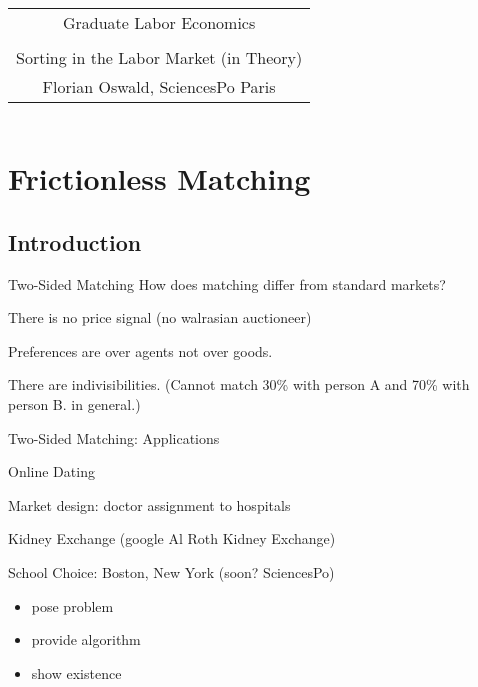 \documentclass{beamer}%
\begin{document}
\title{%
\begin{tabular}{c}
{\small Graduate Labor Economics}\\
\\ 
Sorting in the Labor Market (in Theory)
 \\
{\small Florian Oswald, SciencesPo Paris}
\\
\end{tabular}%
}




\frame{\titlepage} 


\section{Frictionless Matching}

\subsection{Introduction}

\begin{frame}{Two-Sided Matching}
How does matching differ from standard markets?\bigskip
\begin{widee}
\item There is no price signal (no walrasian auctioneer)
\item Preferences are over agents not over goods.
\item There are indivisibilities. (Cannot match 30\% with person A and 70\% with person B. in general.)
\end{widee}
\end{frame}

\begin{frame}{Two-Sided Matching: Applications}
\begin{midi}
\item Online Dating
\item Market design: doctor assignment to hospitals
\item Kidney Exchange (google Al Roth Kidney Exchange)
\item School Choice: Boston, New York (soon? SciencesPo)
\item \cite{gale1962college}
\begin{itemize}
\item pose problem
\item provide algorithm
\item show existence
\end{itemize}
\end{midi}

\end{frame}
\end{document}

